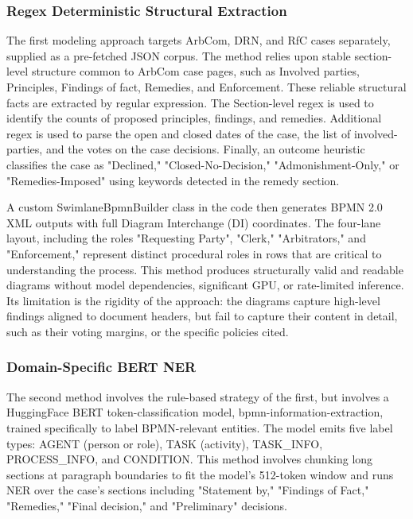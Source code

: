 \documentclass[conference]{IEEEtran}
\begin{document}
\subsubsection{Regex Deterministic Structural Extraction}
The first modeling approach targets ArbCom, DRN, and RfC cases separately, supplied as a pre-fetched JSON corpus. The method relies upon stable section-level structure common to ArbCom case pages, such as Involved parties, Principles, Findings of fact, Remedies, and Enforcement. These reliable structural facts are extracted by regular expression. The Section-level regex is used to identify the counts of proposed principles, findings, and remedies. Additional regex is used to parse the open and closed dates of the case, the list of involved-parties, and the votes on the case decisions. Finally, an outcome heuristic classifies the case as "Declined," "Closed-No-Decision," "Admonishment-Only," or "Remedies-Imposed" using keywords detected in the remedy section.

A custom SwimlaneBpmnBuilder class in the code then generates BPMN 2.0 XML outputs with full Diagram Interchange (DI) coordinates. The four-lane layout, including the roles "Requesting Party", "Clerk," "Arbitrators," and "Enforcement," represent distinct procedural roles in rows that are critical to understanding the process. This method produces structurally valid and readable diagrams without model dependencies, significant GPU, or rate-limited inference. Its limitation is the rigidity of the approach: the diagrams capture high-level findings aligned to document headers, but fail to capture their content in detail, such as their voting margins, or the specific policies cited.

\subsubsection{Domain-Specific BERT NER}
The second method involves the rule-based strategy of the first, but involves a HuggingFace BERT token-classification model, bpmn-information-extraction, trained specifically to label BPMN-relevant entities\cite{b10}. The model emits five label types: AGENT (person or role), TASK (activity), TASK\_INFO, PROCESS\_INFO, and CONDITION. This method involves chunking long sections at paragraph boundaries to fit the model's 512-token window and runs NER over the case's sections including "Statement by," "Findings of Fact," "Remedies," "Final decision," and "Preliminary" decisions.
\end{document}
